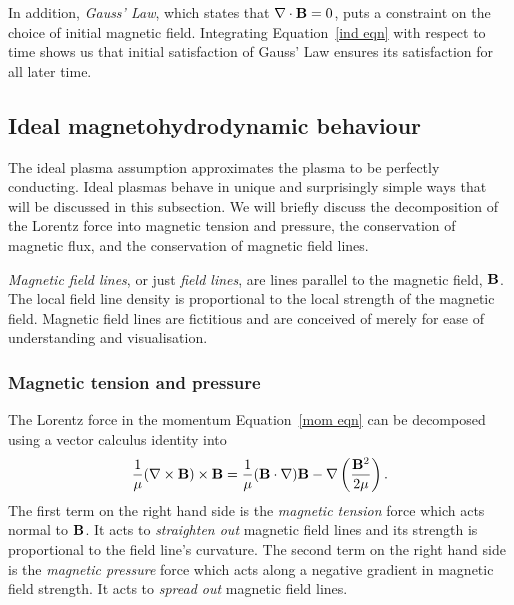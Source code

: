 In addition, \textit{Gauss' Law}, which states that $\nabla\cdot\mathbf{B} = 0$, puts a constraint on the choice of initial magnetic field. Integrating Equation~\eqref{ind eqn} with respect to time shows us that initial satisfaction of Gauss' Law ensures its satisfaction for all later time.


\subsection{Ideal magnetohydrodynamic behaviour}
The ideal plasma assumption approximates the plasma to be perfectly conducting. Ideal plasmas behave in unique and surprisingly simple ways that will be discussed in this subsection. We will briefly discuss the decomposition of the Lorentz force into magnetic tension and pressure, the conservation of magnetic flux, and the conservation of magnetic field lines.

\textit{Magnetic field lines}, or just \textit{field lines}, are lines parallel to the magnetic field, $\mathbf{B}$. The local field line density is proportional to the local strength of the magnetic field. Magnetic field lines are fictitious and are conceived of merely for ease of understanding and visualisation.


\subsubsection{Magnetic tension and pressure}
The Lorentz force in the momentum Equation~\eqref{mom eqn} can be decomposed using a vector calculus identity into
\begin{equation}
	\frac{1}{\mu}(\nabla\times\mathbf{B})\times\mathbf{B} = \frac{1}{\mu}(\mathbf{B}\cdot\nabla)\mathbf{B} - \nabla\left(\frac{\mathbf{B}^2}{2\mu}\right).
\end{equation}
The first term on the right hand side is the \textit{magnetic tension} force which acts normal to $\mathbf{B}$. It acts to \textit{straighten out} magnetic field lines and its strength is proportional to the field line's curvature. The second term on the right hand side is the \textit{magnetic pressure} force which acts along a negative gradient in magnetic field strength. It acts to \textit{spread out} magnetic field lines.


